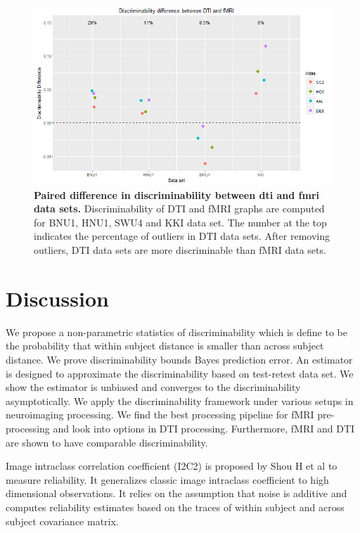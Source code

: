 \documentclass{article}
\begin{document}
\begin{figure}[ht!]
	\includegraphics[width=\linewidth]{../Figs/dti_mri_differ.png}
	\caption{{ \bf Paired difference in discriminability between dti and fmri data sets.} Discriminability of DTI and fMRI graphs are computed for BNU1, HNU1, SWU4 and KKI data set. The number at the top indicates the percentage of outliers in DTI data sets. After removing outliers, DTI data sets are more discriminable than fMRI data sets.}
	\label{fig:dtimri}
\end{figure}

\section{Discussion}

 We propose a non-parametric statistics of discriminability which is define to be the probability that within subject distance is smaller than across subject distance.  We prove discriminability bounds Bayes prediction error. An estimator is designed to approximate the discriminability based on test-retest data set. We show the estimator is unbiased and converges to the discriminability asymptotically. We apply the discriminability framework under various setups in neuroimaging processing. We find the best processing pipeline for fMRI pre-processing and look into options in DTI processing. Furthermore, fMRI and DTI are shown to have comparable discriminability.

 Image intraclass correlation coefficient (I2C2) is proposed by Shou H et al to measure reliability. It generalizes classic image intraclass coefficient to high dimensional observations. It relies on the assumption that noise is additive and computes reliability estimates based on the traces of within subject and across subject covariance matrix. 
\end{document}
